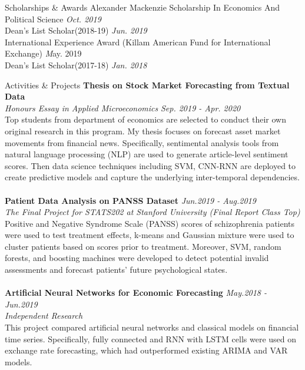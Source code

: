 \documentclass{resume} %
\begin{document}
\begin{rSection}{Scholarships \& Awards}
{Alexander Mackenzie Scholarship In Economics And Political Science} \hfill {\em Oct. 2019} \\
{Dean's List Scholar(2018-19)} \hfill {\em Jun. 2019} \\
{International Experience Award (Killam American Fund for International Exchange)} \hfill{\emph May. 2019} \\
{Dean's List Scholar(2017-18)} \hfill {\em Jan. 2018}
\end{rSection}

\begin{rSection}{Activities \& Projects}
{\bf Thesis on Stock Market Forecasting from Textual Data}
\\ \emph{Honours Essay in Applied Microeconomics} \hfill \emph{Sep. 2019 - Apr. 2020}
\\ Top students from department of economics are selected to conduct their own original research in this program. My thesis focuses on forecast asset market movements from financial news. Specifically, sentimental analysis tools from natural language processing (NLP) are used to generate article-level sentiment scores. Then data science techniques including SVM, CNN-RNN are deployed to create predictive models and capture the underlying inter-temporal dependencies.
\\
\\
{\bf Patient Data Analysis on PANSS Dataset} \hfill \emph{Jun.2019 - Aug.2019}
\\ \emph{The Final Project for STATS202 at Stanford University (Final Report Class Top)}
\\ Positive and Negative Syndrome Scale (PANSS) scores of schizophrenia patients were used to test treatment effects, k-means and Gaussian mixture were used to cluster patients based on scores prior to treatment. Moreover, SVM, random forests, and boosting machines were developed to detect potential invalid assessments and forecast patients' future psychological states.
\\
\\{\bf Artificial Neural Networks for Economic Forecasting} \hfill \emph{May.2018 - Jun.2019}
\\ \emph{Independent Research}
\\ This project compared artificial neural networks and classical models on financial time series. Specifically, fully connected and RNN with LSTM cells were used on exchange rate forecasting, which had outperformed existing ARIMA and VAR models.

\end{rSection}
\end{document}
